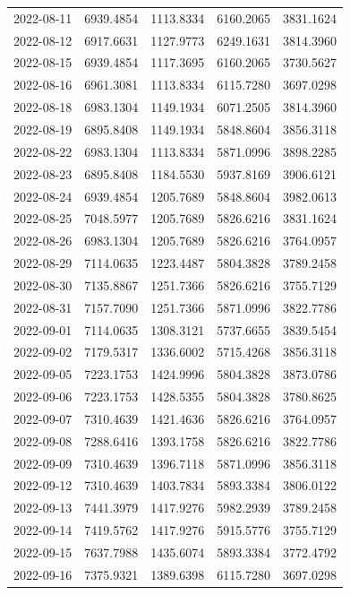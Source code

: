 \begin{footnotesize}
\begin{longtable}{lllll}
2022-08-11 & 6939.4854 & 1113.8334 & 6160.2065 & 3831.1624 \\
2022-08-12 & 6917.6631 & 1127.9773 & 6249.1631 & 3814.3960 \\
2022-08-15 & 6939.4854 & 1117.3695 & 6160.2065 & 3730.5627 \\
2022-08-16 & 6961.3081 & 1113.8334 & 6115.7280 & 3697.0298 \\
2022-08-18 & 6983.1304 & 1149.1934 & 6071.2505 & 3814.3960 \\
2022-08-19 & 6895.8408 & 1149.1934 & 5848.8604 & 3856.3118 \\
2022-08-22 & 6983.1304 & 1113.8334 & 5871.0996 & 3898.2285 \\
2022-08-23 & 6895.8408 & 1184.5530 & 5937.8169 & 3906.6121 \\
2022-08-24 & 6939.4854 & 1205.7689 & 5848.8604 & 3982.0613 \\
2022-08-25 & 7048.5977 & 1205.7689 & 5826.6216 & 3831.1624 \\
2022-08-26 & 6983.1304 & 1205.7689 & 5826.6216 & 3764.0957 \\
2022-08-29 & 7114.0635 & 1223.4487 & 5804.3828 & 3789.2458 \\
2022-08-30 & 7135.8867 & 1251.7366 & 5826.6216 & 3755.7129 \\
2022-08-31 & 7157.7090 & 1251.7366 & 5871.0996 & 3822.7786 \\
2022-09-01 & 7114.0635 & 1308.3121 & 5737.6655 & 3839.5454 \\
2022-09-02 & 7179.5317 & 1336.6002 & 5715.4268 & 3856.3118 \\
2022-09-05 & 7223.1753 & 1424.9996 & 5804.3828 & 3873.0786 \\
2022-09-06 & 7223.1753 & 1428.5355 & 5804.3828 & 3780.8625 \\
2022-09-07 & 7310.4639 & 1421.4636 & 5826.6216 & 3764.0957 \\
2022-09-08 & 7288.6416 & 1393.1758 & 5826.6216 & 3822.7786 \\
2022-09-09 & 7310.4639 & 1396.7118 & 5871.0996 & 3856.3118 \\
2022-09-12 & 7310.4639 & 1403.7834 & 5893.3384 & 3806.0122 \\
2022-09-13 & 7441.3979 & 1417.9276 & 5982.2939 & 3789.2458 \\
2022-09-14 & 7419.5762 & 1417.9276 & 5915.5776 & 3755.7129 \\
2022-09-15 & 7637.7988 & 1435.6074 & 5893.3384 & 3772.4792 \\
2022-09-16 & 7375.9321 & 1389.6398 & 6115.7280 & 3697.0298 \\

\end{longtable}
\end{footnotesize}
